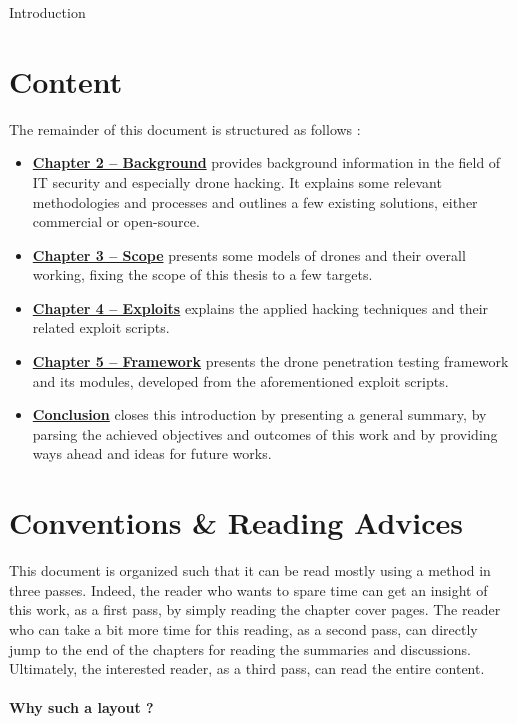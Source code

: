 \begin{chaptercover}{Introduction}
\section{Content}
The remainder of this document is structured as follows :
\begin{itemize}[itemsep=0.1cm,topsep=0.1cm]
  \item \hyperref[background]{\color{FirstBlue}\bfseries Chapter 2 -- Background} provides background information in the field of IT security and especially drone hacking. It explains some relevant methodologies and processes and outlines a few existing solutions, either commercial or open-source.
  \item \hyperref[scope]{\color{FirstBlue}\bfseries Chapter 3 -- Scope} presents some models of drones and their overall working, fixing the scope of this thesis to a few targets.
  \item \hyperref[exploits]{\color{FirstBlue}\bfseries Chapter 4 -- Exploits} explains the applied hacking techniques and their related exploit scripts.
  \item \hyperref[framework]{\color{FirstBlue}\bfseries Chapter 5 -- Framework} presents the drone penetration testing framework and its modules, developed from the aforementioned exploit scripts.
  \item \hyperref[conclusion]{\color{FirstBlue}\bfseries Conclusion} closes this introduction by presenting a general summary, by parsing the achieved objectives and outcomes of this work and by providing ways ahead and ideas for future works.
\end{itemize}


\section{Conventions \& Reading Advices}
This document is organized such that it can be read mostly using a method in three passes. Indeed, the reader who wants to spare time can get an insight of this work, as a first pass, by simply reading the chapter cover pages. The reader who can take a bit more time for this reading, as a second pass, can directly jump to the end of the chapters for reading the summaries and discussions. Ultimately, the interested reader, as a third pass, can read the entire content.

\begin{tip}
\vspace{-.5cm}
\paragraph{Why such a layout ?}\hfill


\end{tip}
\end{chaptercover}
